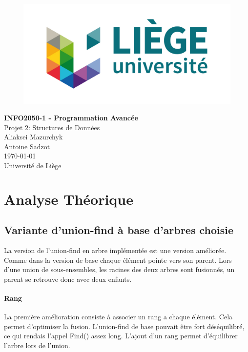 \documentclass[10pt]{article}
\begin{document}
\begin{titlepage}

   \begin{figure}[htbp]
      \centering
      \includegraphics{uliege-logo-couleurs-300.jpg}
   \end{figure}
  	
  	\hfill

	\begin{center}
		\vfill
		\textbf{
		\Huge{INFO2050-1 - Programmation Avancée}}\\
		\bigskip
		\huge{Projet 2: Structures de Données}\\
		\bigskip %
		\smallskip
		\Large{Aliaksei Mazurchyk\\Antoine Sadzot}\\
		\bigskip
		\smallskip
		\large{\today}\\%
		\vfill
		\large{Université de Liège}
	\end{center}
\end{titlepage}
\clearpage
\clearpage

\section{Analyse Théorique}
\subsection{Variante d'union-find à base d'arbres choisie}
	La version de l'union-find en arbre implémentée est une version améliorée. Comme dans la version de base chaque élément pointe vers son parent. Lors d'une union de sous-ensembles, les racines des deux arbres sont fusionnés, un parent se retrouve donc avec deux enfants.
	
	\paragraph{Rang}			
	La première amélioration consiste à associer un rang a chaque élément. Cela permet d'optimiser la fusion. L'union-find de base pouvait être fort déséquilibré, ce qui rendais l'appel Find() assez long. L'ajout d'un rang permet d'équilibrer l'arbre lors de l'union. 
	
\end{document}
